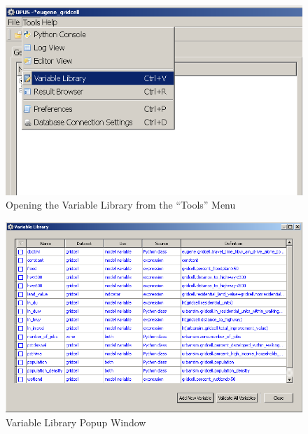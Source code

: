 \begin{figure}[htp]
\begin{center}
\includegraphics[scale=0.6]{part-gui/images/model-manager-variable-library-menu.png}
\end{center}
\caption{Opening the Variable Library from the ``Tools'' Menu}
\label{fig:variable-library-menu}
\end{figure}

\begin{figure}[htp]
\begin{center}
\includegraphics[scale=0.6]{part-gui/images/model-manager-variable-library-popup.png}
\end{center}
\caption{Variable Library Popup Window}
\label{fig:variable-library-popup}
\end{figure}

